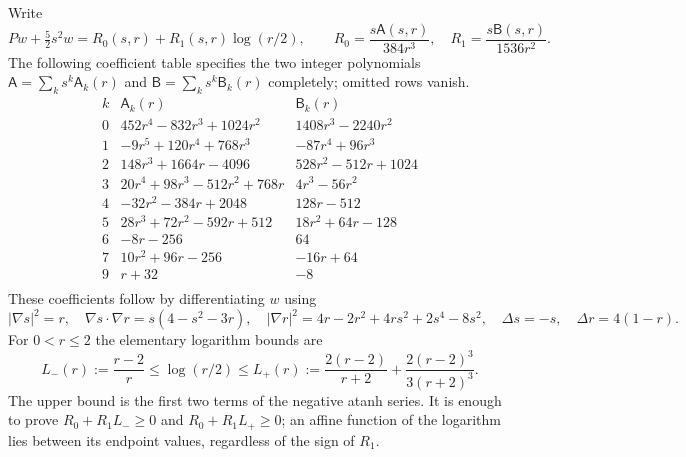 \documentclass[reqno,11pt]{amsart}
\numberwithin{equation}{section}
\theoremstyle{remark}
\begin{document}
Write
\[
 Pw+\tfrac52s^2w=R_0(s,r)+R_1(s,r)\log(r/2),\qquad
 R_0=\frac{s\mathsf A(s,r)}{384r^3},\quad
 R_1=\frac{s\mathsf B(s,r)}{1536r^2}.
\]
The following coefficient table specifies the two integer polynomials
$\mathsf A=\sum_k s^k\mathsf A_k(r)$ and
$\mathsf B=\sum_k s^k\mathsf B_k(r)$ completely; omitted rows vanish.
\[
\begin{array}{c|l|l}
 k&\mathsf A_k(r)&\mathsf B_k(r)\\\hline
0&452r^{4}-832r^{3}+1024r^{2}&1408r^{3}-2240r^{2}\\
1&-9r^{5}+120r^{4}+768r^{3}&-87r^{4}+96r^{3}\\
2&148r^{3}+1664r-4096&528r^{2}-512r+1024\\
3&20r^{4}+98r^{3}-512r^{2}+768r&4r^{3}-56r^{2}\\
4&-32r^{2}-384r+2048&128r-512\\
5&28r^{3}+72r^{2}-592r+512&18r^{2}+64r-128\\
6&-8r-256&64\\
7&10r^{2}+96r-256&-16r+64\\
9&r+32&-8\\
\end{array}
\]
These coefficients follow by differentiating $w$ using
\[
 |\nabla s|^2=r,\quad
 \nabla s\cdot\nabla r=s(4-s^2-3r),\quad
 |\nabla r|^2=4r-2r^2+4rs^2+2s^4-8s^2,
 \quad\Delta s=-s,\quad\Delta r=4(1-r).
\]
For $0<r\le2$ the elementary logarithm bounds are
\[
 L_-(r):=\frac{r-2}{r}\le\log(r/2)
 \le L_+(r):=\frac{2(r-2)}{r+2}
       +\frac{2(r-2)^3}{3(r+2)^3}.
\]
The upper bound is the first two terms of the negative atanh series.
It is enough to prove $R_0+R_1L_-\ge0$ and $R_0+R_1L_+\ge0$;
an affine function of the logarithm lies between its endpoint values,
regardless of the sign of $R_1$.
\end{document}
